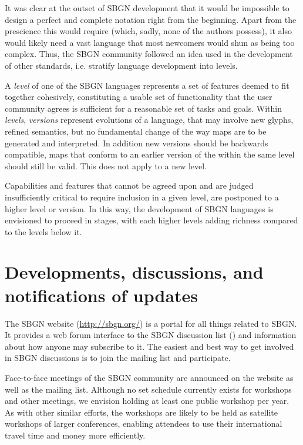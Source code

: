 It was clear at the outset of SBGN development that it would be impossible 
to design a perfect and complete notation right from the beginning.  Apart 
from the prescience this would require (which, sadly, none of the authors 
possess), it also would likely need a vast language that most newcomers 
would shun as being too complex.  Thus, the SBGN community followed an idea 
used in the development of other standards, i.e. stratify language 
development into levels.

A \emph{level} of one of the SBGN languages represents a set of
features deemed to fit together cohesively, constituting a usable set
of functionality that the user community agrees is sufficient for a
reasonable set of tasks and goals.  Within \emph{levels},
\emph{versions} represent evolutions of a language, that may
involve new glyphs, refined semantics, but no fundamental change of
the way maps are to be generated and interpreted. In addition new
versions should be backwards compatible, \ie \PD maps that conform to
an earlier version of the \PDl within the same level should still be
valid.  This does not apply to a new level. 

Capabilities and features that cannot be agreed upon and are judged
insufficiently critical to require inclusion in a given level, are
postponed to a higher level or version.  In this way, the development
of SBGN languages is envisioned to proceed in stages, with each higher
levels adding richness compared to the levels below it.

\section{Developments, discussions, and notifications of updates}
\label{sec:discussions}

The SBGN website (\url{http://sbgn.org/}) is a portal for all things 
related to SBGN.  It provides a web forum interface to the SBGN discussion 
list () and information about how anyone 
may subscribe to it.  The easiest and best way to get involved in SBGN 
discussions is to join the mailing list and participate.

Face-to-face meetings of the SBGN community are announced on the website as 
well as the mailing list.  Although no set schedule currently exists for 
workshops and other meetings, we envision holding at least one public 
workshop per year.  As with other similar efforts, the workshops are likely 
to be held as satellite workshops of larger conferences, enabling attendees 
to use their international travel time and money more efficiently.

